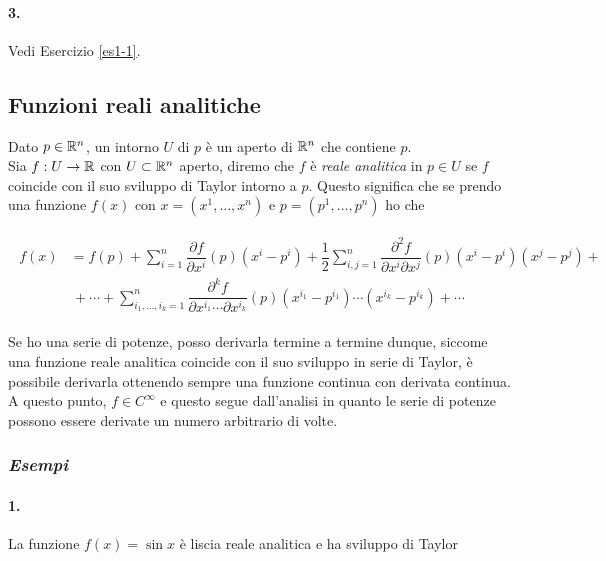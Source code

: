 \paragraph{3.}

Vedi Esercizio \ref{es1-1}.

\subsection{Funzioni reali analitiche}

Dato $ p \in \mathbb{R}^{n} $, un intorno $ U $ di $ p $ è un aperto di $ \mathbb{R}^{n} $ che contiene $ p $.\\
Sia $ f : U \to \mathbb{R} $ con $ U \subset \mathbb{R}^{n} $ aperto, diremo che $ f $ è \textit{reale analitica} in $ p \in U $ se $ f $ coincide con il suo sviluppo di Taylor intorno a $ p $. Questo significa che se prendo una funzione $ f (x) $ con $ x = (x^{1}, \dots, x^{n}) $ e $ p = (p^{1}, \dots, p^{n}) $ ho che

\begin{align}
	\begin{split}
		f (x) &= f (p) + \sum_{i=1}^{n} \dfrac{\partial f}{\partial x^{i}} (p) (x^{i} - p^{i}) + \dfrac{1}{2} \sum_{i,j=1}^{n} \dfrac{\partial^{2} f}{\partial x^{i} \partial x^{j}} (p) (x^{i} - p^{i}) (x^{j} - p^{j}) +\\
		& \, + \cdots + \sum_{i_{1},\dots,i_{k}=1}^{n} \dfrac{\partial^{k} f}{\partial x^{i_{1}} \cdots \partial x^{i_{k}}} (p) (x^{i_{1}} - p^{i_{1}}) \cdots (x^{i_{k}} - p^{i_{k}}) + \cdots
	\end{split}
\end{align}

Se ho una serie di potenze, posso derivarla termine a termine dunque, siccome una funzione reale analitica coincide con il suo sviluppo in serie di Taylor, è possibile derivarla ottenendo sempre una funzione continua con derivata continua. A questo punto, $ f \in C^{\infty} $ e questo segue dall'analisi in quanto le serie di potenze possono essere derivate un numero arbitrario di volte.

\subsubsection{\textit{Esempi}}

\paragraph{1.}

La funzione $ f (x) = \sin x $ è liscia reale analitica e ha sviluppo di Taylor

